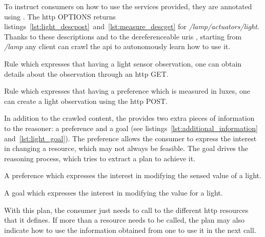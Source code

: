 
To instruct consumers on how to use the services provided, they are annotated using \restdesc{}.
The \acs{http} OPTIONS returns listings~\ref{lst:light_descpost}~and~\ref{lst:measure_descget} for \emph{/lamp/actuators/light}.
Thanks to these descriptions and to the dereferenceable \acsp{uri} \citep{sauermann_cool_2008}, starting from \emph{/lamp} any client can crawl the \acs{api} to autonomously learn how to use it.

\begin{listing}
  
  \caption[Rule which describes the \acs{http} GET for a resource]{Rule which expresses that having a light sensor observation, one can obtain details about the observation through an \acs{http} GET.}
  \label{lst:measure_descget}
\end{listing}

\begin{listing}
  
  \caption[Rule which describes the \acs{http} POST for a resource]{Rule which expresses that having a preference which is measured in luxes, one can create a light observation using the \acs{http} POST.}
  \label{lst:light_descpost}
\end{listing}


In addition to the crawled content, the \nodeConsRest{} provides two extra pieces of information to the reasoner: a preference and a goal (see listings~\ref{lst:additional_information} and~\ref{lst:light_goal}).
The preference allows the consumer to express the interest in changing a resource, which may not always be feasible.
The goal drives the reasoning process, which tries to extract a plan to achieve it.

\begin{listing}
  
  \caption[Semantically described light preference]{A preference which expresses the interest in modifying the sensed value of a light.}
  \label{lst:additional_information}
\end{listing}

\begin{listing}
  
  \caption[Goal rule to change the light level]{A goal which expresses the interest in modifying the value for a light.}
  \label{lst:light_goal}
\end{listing}

With this plan, the consumer just needs to call to the different \acs{http} resources that it defines.
If more than a resource needs to be called, the plan may also indicate how to use the information obtained from one to use it in the next call.